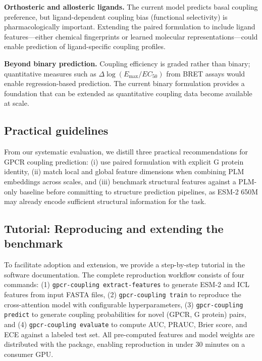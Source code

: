 \documentclass[11pt,a4paper]{article}
\begin{document}
\textbf{Orthosteric and allosteric ligands.} The current model predicts basal coupling preference, but ligand-dependent coupling bias (functional selectivity) is pharmacologically important. Extending the paired formulation to include ligand features---either chemical fingerprints or learned molecular representations---could enable prediction of ligand-specific coupling profiles.

\textbf{Beyond binary prediction.} Coupling efficiency is graded rather than binary; quantitative measures such as $\Delta \log(E_{\text{max}}/EC_{50})$ from BRET assays would enable regression-based prediction. The current binary formulation provides a foundation that can be extended as quantitative coupling data become available at scale.

\subsection{Practical guidelines}

From our systematic evaluation, we distill three practical recommendations for GPCR coupling prediction: (i) use paired formulation with explicit G protein identity, (ii) match local and global feature dimensions when combining PLM embeddings across scales, and (iii) benchmark structural features against a PLM-only baseline before committing to structure prediction pipelines, as ESM-2 650M may already encode sufficient structural information for the task.

\subsection{Tutorial: Reproducing and extending the benchmark}

To facilitate adoption and extension, we provide a step-by-step tutorial in the software documentation. The complete reproduction workflow consists of four commands: (1) \texttt{gpcr-coupling extract-features} to generate ESM-2 and ICL features from input FASTA files, (2) \texttt{gpcr-coupling train} to reproduce the cross-attention model with configurable hyperparameters, (3) \texttt{gpcr-coupling predict} to generate coupling probabilities for novel (GPCR, G protein) pairs, and (4) \texttt{gpcr-coupling evaluate} to compute AUC, PRAUC, Brier score, and ECE against a labeled test set. All pre-computed features and model weights are distributed with the package, enabling reproduction in under 30 minutes on a consumer GPU.

\end{document}
